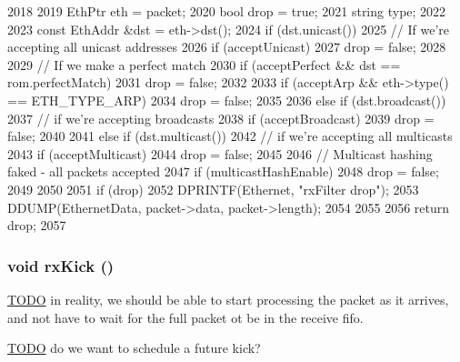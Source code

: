 \begin{DoxyCode}
2018 {
2019     EthPtr eth = packet;
2020     bool drop = true;
2021     string type;
2022 
2023     const EthAddr &dst = eth->dst();
2024     if (dst.unicast()) {
2025         // If we're accepting all unicast addresses
2026         if (acceptUnicast)
2027             drop = false;
2028 
2029         // If we make a perfect match
2030         if (acceptPerfect && dst == rom.perfectMatch)
2031             drop = false;
2032 
2033         if (acceptArp && eth->type() == ETH_TYPE_ARP)
2034             drop = false;
2035 
2036     } else if (dst.broadcast()) {
2037         // if we're accepting broadcasts
2038         if (acceptBroadcast)
2039             drop = false;
2040 
2041     } else if (dst.multicast()) {
2042         // if we're accepting all multicasts
2043         if (acceptMulticast)
2044             drop = false;
2045 
2046         // Multicast hashing faked - all packets accepted
2047         if (multicastHashEnable)
2048             drop = false;
2049     }
2050 
2051     if (drop) {
2052         DPRINTF(Ethernet, "rxFilter drop\n");
2053         DDUMP(EthernetData, packet->data, packet->length);
2054     }
2055 
2056     return drop;
2057 }
\end{DoxyCode}
\hypertarget{classNSGigE_a5fa946a73db6f59c9819d457c991486a}{
\subsubsection[{rxKick}]{\setlength{\rightskip}{0pt plus 5cm}void rxKick ()}}
\label{classNSGigE_a5fa946a73db6f59c9819d457c991486a}


\begin{Desc}
\item[\hyperlink{todo__todo000067}{TODO}]in reality, we should be able to start processing the packet as it arrives, and not have to wait for the full packet ot be in the receive fifo. \end{Desc}


\begin{Desc}
\item[\hyperlink{todo__todo000068}{TODO}]do we want to schedule a future kick? \end{Desc}




